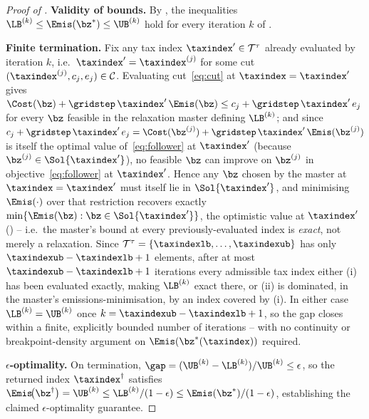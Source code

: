 \begin{proof}[Proof of ]
\textbf{Validity of bounds.}
By , the inequalities
$\LB^{(k)}\le\Emis(\bz^{*})\le\UB^{(k)}$ hold for every iteration $k$
of .

\textbf{Finite termination.}
Fix any tax index $\taxindex'\in\mathcal{T}^{\tau}$ already evaluated by
iteration $k$, i.e.\ $\taxindex'=\taxindex^{(j)}$ for some cut
$(\taxindex^{(j)},c_{j},e_{j})\in\mathcal{C}$. Evaluating
cut~\eqref{eq:cut} at $\taxindex=\taxindex'$ gives
$\Cost(\bz)+\gridstep\,\taxindex'\,\Emis(\bz)\le
c_{j}+\gridstep\,\taxindex'\,e_{j}$ for every $\bz$ feasible in the
relaxation master defining $\LB^{(k)}$; and since
$c_{j}+\gridstep\,\taxindex'\,e_{j}=\Cost(\bz^{(j)})+\gridstep\,\taxindex'\,\Emis(\bz^{(j)})$
is itself the optimal value of~\eqref{eq:follower} at $\taxindex'$
(because $\bz^{(j)}\in\Sol{\taxindex'}$), no feasible $\bz$ can improve
on $\bz^{(j)}$ in objective~\eqref{eq:follower} at $\taxindex'$. Hence
any $\bz$ chosen by the master at $\taxindex=\taxindex'$ must itself lie
in $\Sol{\taxindex'}$, and minimising $\Emis(\cdot)$ over that
restriction recovers exactly $\min\{\Emis(\bz):\bz\in\Sol{\taxindex'}\}$,
the optimistic value at $\taxindex'$ () -- i.e.\ the
master's bound at every previously-evaluated index is \emph{exact},
not merely a relaxation. Since $\mathcal{T}^{\tau}=\{\taxindexlb,\ldots,\taxindexub\}$
has only $\taxindexub-\taxindexlb+1$ elements, after at most $\taxindexub-\taxindexlb+1$
iterations every admissible tax index either (i) has been evaluated
exactly, making $\LB^{(k)}$ exact there, or (ii) is dominated, in the
master's emissions-minimisation, by an index covered by (i). In
either case $\LB^{(k)}=\UB^{(k)}$ once $k=\taxindexub-\taxindexlb+1$, so the gap
closes within a finite, explicitly bounded number of iterations --
with no continuity or breakpoint-density argument on
$\Emis(\bz^{*}(\taxindex))$ required.

\textbf{$\epsilon$-optimality.}
On termination, $\gap=(\UB^{(k)}-\LB^{(k)})/\UB^{(k)}\le\epsilon$, so
the returned index $\taxindex^{\dagger}$ satisfies
$\Emis\!\bigl(\bz^{\dagger}\bigr)=\UB^{(k)}
 \le\LB^{(k)}/(1-\epsilon)
 \le\Emis(\bz^{*})/(1-\epsilon)$, establishing the claimed
$\epsilon$-optimality guarantee.
\end{proof}
